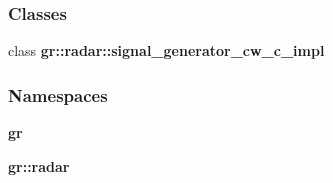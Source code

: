 \subsubsection*{Classes}
\begin{DoxyCompactItemize}
\item 
class {\bf gr\+::radar\+::signal\+\_\+generator\+\_\+cw\+\_\+c\+\_\+impl}
\end{DoxyCompactItemize}
\subsubsection*{Namespaces}
\begin{DoxyCompactItemize}
\item 
 {\bf gr}
\item 
 {\bf gr\+::radar}
\end{DoxyCompactItemize}

